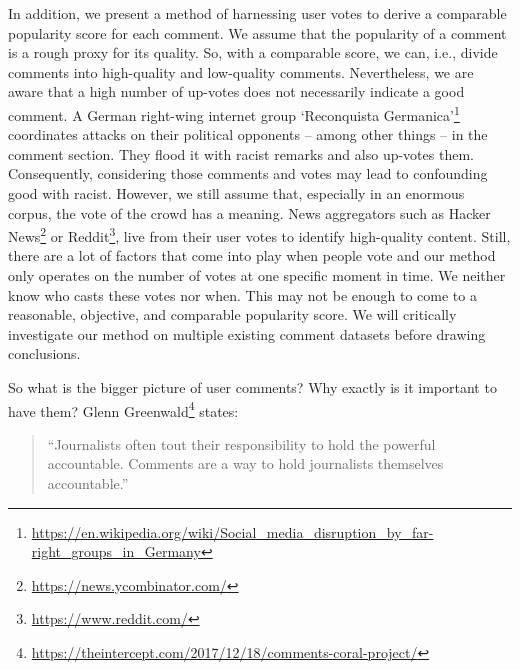 
In addition, we present a method of harnessing user votes to derive a comparable popularity score for each comment. We assume that the popularity of a comment is a rough proxy for its quality. So, with a comparable score, we can, i.e., divide comments into high-quality and low-quality comments. Nevertheless, we are aware that a high number of up-votes does not necessarily indicate a good comment. A German right-wing internet group `Reconquista Germanica'\footnote{\url{https://en.wikipedia.org/wiki/Social_media_disruption_by_far-right_groups_in_Germany}} coordinates attacks on their political opponents -- among other things -- in the comment section. They flood it with racist remarks and also up-votes them. Consequently, considering those comments and votes may lead to confounding good with racist. However, we still assume that, especially in an enormous corpus, the vote of the crowd has a meaning. News aggregators such as Hacker News\footnote{\url{https://news.ycombinator.com/}} or Reddit\footnote{\url{https://www.reddit.com/}}, live from their user votes to identify high-quality content. Still, there are a lot of factors that come into play when people vote and our method only operates on the number of votes at one specific moment in time. We neither know who casts these votes nor when. This may not be enough to come to a reasonable, objective, and comparable popularity score. We will critically investigate our method on multiple existing comment datasets before drawing conclusions.

So what is the bigger picture of user comments? Why exactly is it important to have them? Glenn Greenwald\footnote{\url{https://theintercept.com/2017/12/18/comments-coral-project/}} states:
\begin{quote}
``Journalists often tout their responsibility to hold the powerful accountable. Comments are a way to hold journalists themselves accountable.''
\end{quote}

